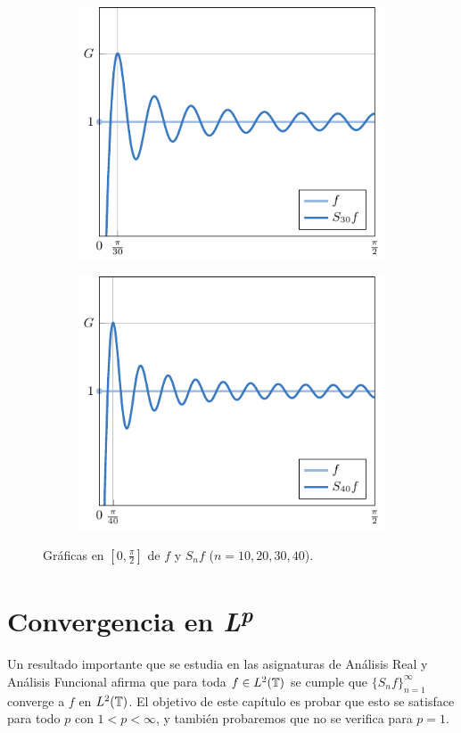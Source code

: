 \documentclass[a4paper, 12pt]{book}
\begin{document}
\begin{figure}[H]
\begin{subfigure}[b]{0.49\textwidth}
    \includegraphics{./plot7/main.pdf}
\end{subfigure}
\begin{subfigure}[b]{0.49\textwidth}
    \centering
    \includegraphics{./plot8/main.pdf}
\end{subfigure}
\caption{Gráficas en $[0,\frac{\pi}{2}]$ de $f$ y $S_nf$ ($n = 10,20,30,40$).}
\end{figure}

\chapter{Convergencia en \texorpdfstring{\textit{L\textsuperscript{p}}}{\textit{Lp}}}

Un resultado importante que se estudia en las asignaturas de Análisis Real y Análisis Funcional afirma que para toda $f \in L^2(\mathbb T)$ se cumple que $\{S_nf\}_{n=1}^\infty$ converge a $f$ en $L^2(\mathbb T)$. El objetivo de este capítulo es probar que esto se satisface para todo $p$ con $1 < p < \infty$, y también probaremos que no se verifica para $p = 1$. 
\end{document}
